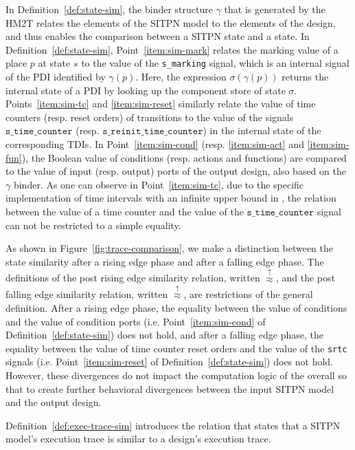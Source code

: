 In Definition~\ref{def:state-sim}, the binder structure $\gamma$ that
is generated by the HM2T relates the elements of the SITPN model to
the elements of the \hvhdl{} design, and thus enables the comparison
between a SITPN state and a \hvhdl{} state. In
Definition~\ref{def:state-sim}, Point~\ref{item:sim-mark} relates the
marking value of a place $p$ at state $s$ to the value of the
\texttt{s\_marking} signal, which is an internal signal of the PDI
identified by $\gamma(p)$. Here, the expression $\sigma(\gamma(p))$
returns the internal state of a PDI by looking up the component store
of state $\sigma$. Points~\ref{item:sim-tc} and \ref{item:sim-reset}
similarly relate the value of time counters (resp. reset orders) of
transitions to the value of the signals $\texttt{s\_time\_counter}$
(resp. $\texttt{s\_reinit\_time\_counter}$) in the internal state of
the corresponding TDIs. In Point~\ref{item:sim-cond}
(resp. \ref{item:sim-act} and \ref{item:sim-fun}), the Boolean value
of conditions (resp. actions and functions) are compared to the value
of input (resp. output) ports of the output design, also based on the
$\gamma$ binder.  As one can observe in Point~\ref{item:sim-tc}, due
to the specific implementation of time intervals with an infinite
upper bound in \hvhdl{}, the relation between the value of a time
counter and the value of the $\texttt{s\_time\_counter}$ signal can
not be restricted to a simple equality.

As shown in Figure~\ref{fig:trace-comparison}, we make a distinction
between the state similarity after a rising edge phase and after a
falling edge phase. The definitions of the post rising edge similarity
relation, written $\stackrel{\uparrow}{\approx}$, and the post falling
edge similarity relation, written $\stackrel{\uparrow}{\approx}$, are
restrictions of the general definition. After a rising edge phase, the
equality between the value of conditions and the value of condition
ports (i.e. Point~\ref{item:sim-cond} of
Definition~\ref{def:state-sim}) does not hold, and after a falling
edge phase, the equality between the value of time counter reset
orders and the value of the \texttt{srtc} signals
(i.e. Point~\ref{item:sim-reset} of Definition~\ref{def:state-sim})
does not hold. However, these divergences do not impact the
computation logic of the overall so that to create further behavioral
divergences between the input SITPN model and the output \hvhdl{}
design.

Definition~\ref{def:exec-trace-sim} introduces the relation that
states that a SITPN model's execution trace is similar to a \hvhdl{}
design's execution trace.


